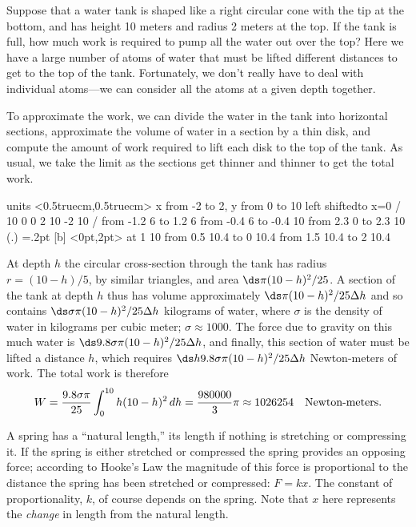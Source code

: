 \begin{example} Suppose that a water tank is shaped like a right circular
cone with the tip at the bottom, and has height 10 meters and radius 2
meters at the top. If the tank is full, how much work is required
to pump all the water out over the top? Here we have a large number of
atoms of water that must be lifted different distances to get to the
top of the tank. Fortunately, we don't really have to deal with
individual atoms---we can consider all the atoms at a given depth
together. 

To approximate the work, we can divide the water in the tank into
horizontal sections, approximate the volume of water in a section by a
thin disk, and compute the amount of work required to lift each disk
to the top of the tank. As usual, we take the limit as the sections
get thinner and thinner to get the total work.

\figure
\vbox{\beginpicture
\normalgraphs
\ninepoint
\setcoordinatesystem units <0.5truecm,0.5truecm>
\setplotarea x from -2 to 2, y from 0 to 10
\axis left shiftedto x=0 /
 10 0 0 2 10 -2 10 /
\setdashes
\putrule from -1.2 6 to 1.2 6
 from -0.4 6 to -0.4 10
 from 2.3 0 to 2.3 10
\setplotsymbol ({\teeny.})
\plotsymbolspacing=.2pt
 [b] <0pt,2pt> at 1 10
\arrow <2pt> [0.7, 2] from 0.5 10.4 to 0 10.4
\arrow <2pt> [0.7, 2] from 1.5 10.4 to 2 10.4
\endpicture}

At depth $h$ the circular cross-section through the tank has radius
$r=(10-h)/5$, by similar triangles,
 and area $\ds \pi(10-h)^2/25$. A section of the tank at depth
$h$ thus has volume approximately $\ds \pi(10-h)^2/25\Delta h$ and so
contains $\ds \sigma\pi(10-h)^2/25\Delta h$ kilograms of water, where
$\sigma$ is the density of water in kilograms per cubic meter;
$\sigma\approx 1000$. The force due to gravity on this much water is
$\ds 9.8\sigma\pi(10-h)^2/25\Delta h$, and finally, this section of water
must be lifted a distance $h$, which requires
$\ds h9.8\sigma\pi(10-h)^2/25\Delta h$ Newton-meters of work. The total
work is therefore
$$W={9.8\sigma\pi\over 25} \int_0^{10} h(10-h)^2\,dh={980000\over3}\pi\approx
1026254\quad\hbox{Newton-meters.}$$
\end{example}

A spring has a ``natural length,'' its length if nothing is stretching
or compressing it. If the spring is either stretched or compressed the
spring provides an opposing force; according to {\dfont Hooke's
Law\/} the magnitude of this force is proportional to the
distance the spring has been stretched or compressed: $F=kx$.
The constant of proportionality, $k$, of course depends on the
spring. Note that $x$ here represents the {\em change\/} in length from the
natural length.

